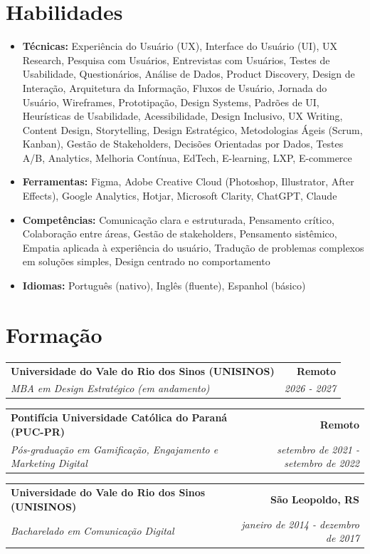 \documentclass[a4paper,10pt]{article}
\makeatletter
\newcommand{\entry}[4]{%
  \begin{tabularx}{\textwidth}{@{}X r@{}}

    \textbf{\large #1} & \textbf{\large #2} \\
    \textit{#3} & \textit{#4} \\
  \end{tabularx}\vspace{1pt}}
\newenvironment{items}{\begin{itemize}[leftmargin=26pt,itemsep=3pt,parsep=0pt,topsep=0pt,partopsep=0pt,label=\textbullet]}{\end{itemize}\vspace{8pt}}
\makeatother
\begin{document}
\section{Habilidades}
\begin{items}
  \item \textbf{Técnicas:} Experiência do Usuário (UX), Interface do Usuário (UI), UX Research, Pesquisa com Usuários, Entrevistas com Usuários, Testes de Usabilidade, Questionários, Análise de Dados, Product Discovery, Design de Interação, Arquitetura da Informação, Fluxos de Usuário, Jornada do Usuário, Wireframes, Prototipação, Design Systems, Padrões de UI, Heurísticas de Usabilidade, Acessibilidade, Design Inclusivo, UX Writing, Content Design, Storytelling, Design Estratégico, Metodologias Ágeis (Scrum, Kanban), Gestão de Stakeholders, Decisões Orientadas por Dados, Testes A/B, Analytics, Melhoria Contínua, EdTech, E-learning, LXP, E-commerce
  \item \textbf{Ferramentas:} Figma, Adobe Creative Cloud (Photoshop, Illustrator, After Effects), Google Analytics, Hotjar, Microsoft Clarity, ChatGPT, Claude
  \item \textbf{Competências:} Comunicação clara e estruturada, Pensamento crítico, Colaboração entre áreas, Gestão de stakeholders, Pensamento sistêmico, Empatia aplicada à experiência do usuário, Tradução de problemas complexos em soluções simples, Design centrado no comportamento
  \item \textbf{Idiomas:} Português (nativo), Inglês (fluente), Espanhol (básico)
\end{items}

\section{Formação}

\entry{Universidade do Vale do Rio dos Sinos (UNISINOS)}{Remoto}{MBA em Design Estratégico (em andamento)}{2026 - 2027}
\vspace{6pt}

\entry{Pontifícia Universidade Católica do Paraná (PUC-PR)}{Remoto}{Pós-graduação em Gamificação, Engajamento e Marketing Digital}{setembro de 2021 - setembro de 2022}
\vspace{6pt}

\entry{Universidade do Vale do Rio dos Sinos (UNISINOS)}{São Leopoldo, RS}{Bacharelado em Comunicação Digital}{janeiro de 2014 - dezembro de 2017}
\end{document}
